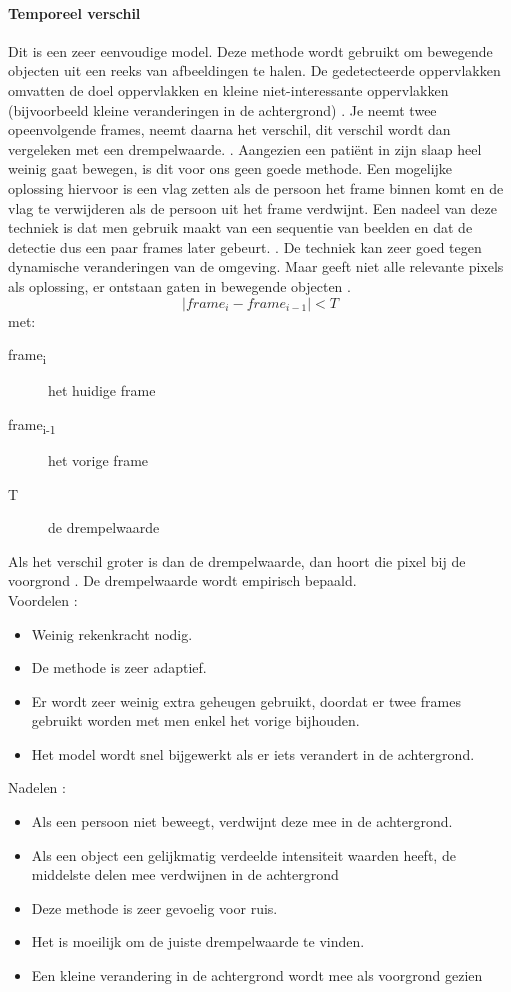 \paragraph{Temporeel verschil}
\label{refFRD}
Dit is een zeer eenvoudige model. Deze methode wordt gebruikt om bewegende objecten uit een reeks van afbeeldingen te halen. De gedetecteerde oppervlakken omvatten de doel oppervlakken en kleine niet-interessante oppervlakken (bijvoorbeeld kleine veranderingen in de achtergrond) \cite{bibTeV}. Je neemt twee opeenvolgende frames, neemt daarna het verschil, dit verschil wordt dan vergeleken met een drempelwaarde. \cite{bibIPC2}. Aangezien een pati\"ent in zijn slaap heel weinig gaat bewegen, is dit voor ons geen goede methode. Een mogelijke oplossing hiervoor is een vlag zetten als de persoon het frame binnen komt en de vlag te verwijderen als de persoon uit het frame verdwijnt. Een nadeel van deze techniek is dat men gebruik maakt van een sequentie van beelden en dat de detectie dus een paar frames later gebeurt. \cite{bibIRC}. De techniek kan zeer goed tegen dynamische veranderingen van de omgeving. Maar geeft niet alle relevante pixels als oplossing, er ontstaan gaten in bewegende objecten \cite{bibTVD}.
\begin{displaymath}
|frame_{i}-frame_{i-1}|<T
\end{displaymath}
met:
\begin{description}
	\item [frame\textsubscript{i}] het huidige frame
	\item [frame\textsubscript{i-1}] het vorige frame
	\item [T] de drempelwaarde
\end{description}
Als het verschil groter is dan de drempelwaarde, dan hoort die pixel bij de voorgrond \cite{bibBET3}. De drempelwaarde wordt empirisch bepaald.\\
Voordelen \cite{bibTeV}:
\begin{itemize}
	\item Weinig rekenkracht nodig.
	\item De methode is zeer adaptief.
	\item Er wordt zeer weinig extra geheugen gebruikt, doordat er twee frames gebruikt worden met men enkel het vorige bijhouden.
	\item Het model wordt snel bijgewerkt als er iets verandert in de achtergrond.
\end{itemize}
Nadelen \cite{bibTeV}:
\begin{itemize}
	\item Als een persoon niet beweegt, verdwijnt deze mee in de achtergrond.
	\item Als een object een gelijkmatig verdeelde intensiteit waarden heeft, de middelste delen mee verdwijnen in de achtergrond
	\item Deze methode is zeer gevoelig voor ruis.
	\item Het is moeilijk om de juiste drempelwaarde te vinden.
	\item Een kleine verandering in de achtergrond wordt mee als voorgrond gezien 
\end{itemize}
